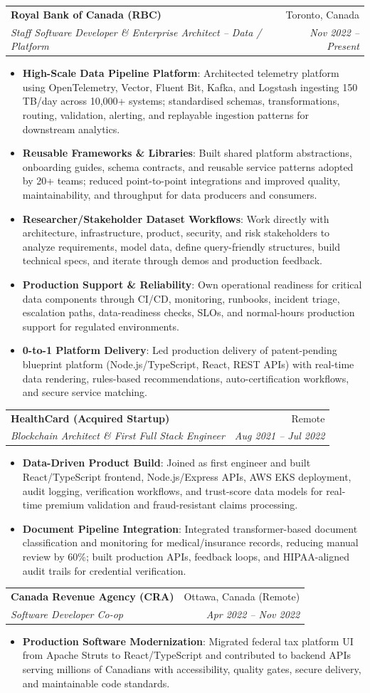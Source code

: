 \documentclass[letterpaper,9.5pt]{article}
\makeatletter
\newcommand{\resumeItem}[2]{\item\small{\textbf{#1}{: #2 \vspace{-2pt}}}}
\newcommand{\resumeSubheading}[4]{\vspace{-2pt}\item\begin{tabular*}{0.97\textwidth}{l@{\extracolsep{\fill}}r}\textbf{#1} & #2 \\\textit{\small#3} & \textit{\small #4} \\\end{tabular*}\vspace{-6pt}}
\newcommand{\resumeItemListStart}{\begin{itemize}}
\newcommand{\resumeItemListEnd}{\end{itemize}\vspace{-6pt}}
\makeatother
\begin{document}
  \resumeSubheading
    {Royal Bank of Canada (RBC)}{Toronto, Canada}
    {Staff Software Developer \& Enterprise Architect -- Data / Platform}{Nov 2022 -- Present}
  \resumeItemListStart
    \resumeItem{High-Scale Data Pipeline Platform}
      {Architected telemetry platform using OpenTelemetry, Vector, Fluent Bit, Kafka, and Logstash ingesting 150\,TB/day across 10,000+ systems; standardised schemas, transformations, routing, validation, alerting, and replayable ingestion patterns for downstream analytics.}
    \resumeItem{Reusable Frameworks \& Libraries}
      {Built shared platform abstractions, onboarding guides, schema contracts, and reusable service patterns adopted by 20+ teams; reduced point-to-point integrations and improved quality, maintainability, and throughput for data producers and consumers.}
    \resumeItem{Researcher/Stakeholder Dataset Workflows}
      {Work directly with architecture, infrastructure, product, security, and risk stakeholders to analyze requirements, model data, define query-friendly structures, build technical specs, and iterate through demos and production feedback.}
    \resumeItem{Production Support \& Reliability}
      {Own operational readiness for critical data components through CI/CD, monitoring, runbooks, incident triage, escalation paths, data-readiness checks, SLOs, and normal-hours production support for regulated environments.}
    \resumeItem{0-to-1 Platform Delivery}
      {Led production delivery of patent-pending blueprint platform (Node.js/TypeScript, React, REST APIs) with real-time data rendering, rules-based recommendations, auto-certification workflows, and secure service matching.}
  \resumeItemListEnd

  \resumeSubheading
    {HealthCard (Acquired Startup)}{Remote}
    {Blockchain Architect \& First Full Stack Engineer}{Aug 2021 -- Jul 2022}
  \resumeItemListStart
    \resumeItem{Data-Driven Product Build}
      {Joined as first engineer and built React/TypeScript frontend, Node.js/Express APIs, AWS EKS deployment, audit logging, verification workflows, and trust-score data models for real-time premium validation and fraud-resistant claims processing.}
    \resumeItem{Document Pipeline Integration}
      {Integrated transformer-based document classification and monitoring for medical/insurance records, reducing manual review by 60\%; built production APIs, feedback loops, and HIPAA-aligned audit trails for credential verification.}
  \resumeItemListEnd

  \resumeSubheading
    {Canada Revenue Agency (CRA)}{Ottawa, Canada (Remote)}
    {Software Developer Co-op}{Apr 2022 -- Nov 2022}
  \resumeItemListStart
    \resumeItem{Production Software Modernization}
      {Migrated federal tax platform UI from Apache Struts to React/TypeScript and contributed to backend APIs serving millions of Canadians with accessibility, quality gates, secure delivery, and maintainable code standards.}
  \resumeItemListEnd
\end{document}
